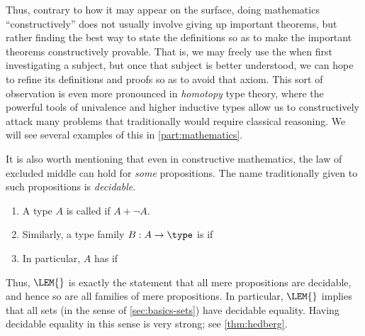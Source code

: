 Thus, contrary to how it may appear on the surface, doing mathematics ``constructively'' does not usually involve giving up important theorems, but rather finding the best way to state the definitions so as to make the important theorems constructively provable.
That is, we may freely use the \LEM{} when first investigating a subject, but once that subject is better understood, we can hope to refine its definitions and proofs so as to avoid that axiom.
This sort of observation is even more pronounced in \emph{homotopy} type theory, where the powerful tools of univalence and higher inductive types allow us to constructively attack many problems that traditionally would require classical reasoning.
We will see several examples of this in \cref{part:mathematics}.

It is also worth mentioning that even in constructive mathematics, the law of excluded middle can hold for \emph{some} propositions.
The name traditionally given to such propositions is \emph{decidable}.

\begin{defn}\label{defn:decidable-equality}
  \mbox{}
  \begin{enumerate}
  \item A type $A$ is called 
    if $A+\neg A$.
  \item Similarly, a type family $B:A\to \type$ is 
    if  \label{item:decidable-equality2}
  \item In particular, $A$ has 
    if 
  \end{enumerate}
\end{defn}

Thus, $\LEM{}$ is exactly the statement that all mere propositions are decidable, and hence so are all families of mere propositions.
In particular, $\LEM{}$ implies that all sets (in the sense of \cref{sec:basics-sets}) have decidable equality.
Having decidable equality in this sense is very strong; see \cref{thm:hedberg}.

